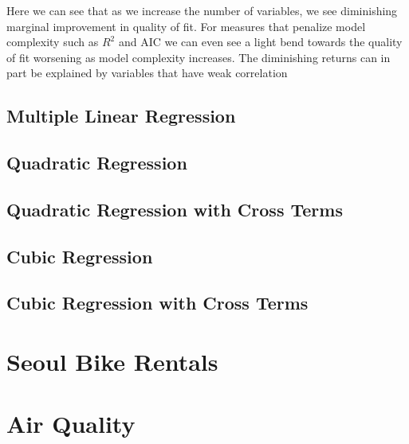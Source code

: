 \documentclass{article}
\begin{document}
	Here we can see that as we increase the number of variables, we see diminishing marginal improvement in quality of 
	fit. For measures that penalize model complexity such as $R^2$ and AIC we can even see a light bend towards 
	the quality of fit worsening as model complexity increases. The diminishing returns can in part be explained by 
	variables that have weak correlation 
	
	
	
	\subsection{Multiple Linear Regression} 
	\subsection{Quadratic Regression} 
	\subsection{Quadratic Regression with Cross Terms} 
	\subsection{Cubic Regression} 
	\subsection{Cubic Regression with Cross Terms} 
	
	
	\section{Seoul Bike Rentals}
	\section{Air Quality}
	
	
\end{document}
